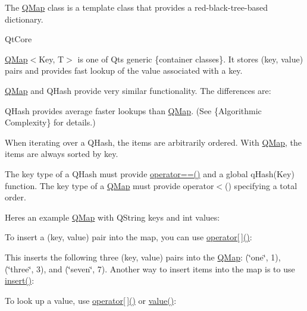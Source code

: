 The \hyperlink{class_q_map}{Q\+Map} class is a template class that provides a red-\/black-\/tree-\/based dictionary. 

Qt\+Core

\hyperlink{class_q_map}{Q\+Map}$<$Key, T$>$ is one of Qt\textquotesingle{}s generic \{container classes\}. It stores (key, value) pairs and provides fast lookup of the value associated with a key.

\hyperlink{class_q_map}{Q\+Map} and Q\+Hash provide very similar functionality. The differences are\+:

\begin{DoxyItemize}
\item Q\+Hash provides average faster lookups than \hyperlink{class_q_map}{Q\+Map}. (See \{Algorithmic Complexity\} for details.) \item When iterating over a Q\+Hash, the items are arbitrarily ordered. With \hyperlink{class_q_map}{Q\+Map}, the items are always sorted by key. \item The key type of a Q\+Hash must provide \hyperlink{class_q_map_afe77d0e5e8feb53142b48b2e9ec8b7fa}{operator==()} and a global q\+Hash(\+Key) function. The key type of a \hyperlink{class_q_map}{Q\+Map} must provide operator$<$() specifying a total order. \end{DoxyItemize}
Here\textquotesingle{}s an example \hyperlink{class_q_map}{Q\+Map} with Q\+String keys and {\ttfamily int} values\+: 
\begin{DoxyCodeInclude}
\end{DoxyCodeInclude}
 To insert a (key, value) pair into the map, you can use \hyperlink{class_q_map_a69dc3a1b9dde2e59e829a7baa9761bc7}{operator\mbox{[}$\,$\mbox{]}()}\+:


\begin{DoxyCodeInclude}
\end{DoxyCodeInclude}
 This inserts the following three (key, value) pairs into the \hyperlink{class_q_map}{Q\+Map}\+: (\char`\"{}one\char`\"{}, 1), (\char`\"{}three\char`\"{}, 3), and (\char`\"{}seven\char`\"{}, 7). Another way to insert items into the map is to use \hyperlink{class_q_map_a0cc56ab47ea14af1127ac7399814d289}{insert()}\+:


\begin{DoxyCodeInclude}
\end{DoxyCodeInclude}
 To look up a value, use \hyperlink{class_q_map_a69dc3a1b9dde2e59e829a7baa9761bc7}{operator\mbox{[}$\,$\mbox{]}()} or \hyperlink{class_q_map_ab9c04f61f4abd94439d4431118a238e5}{value()}\+:


